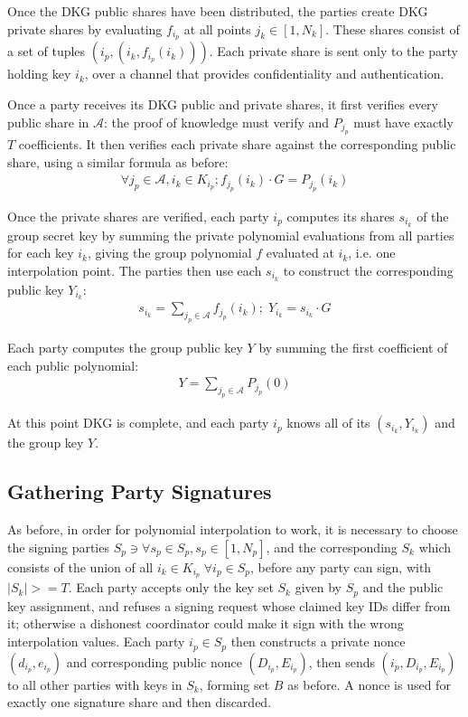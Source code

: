 \documentclass{article}
\theoremstyle{plain}
\theoremstyle{definition}
\theoremstyle{remark}
\begin{document}
Once the DKG public shares have been distributed, the parties create DKG private shares by evaluating $f_{i_p}$ at all points $j_k \in [1, N_k]$.  These shares consist of a set of tuples $(i_p, (i_k, f_{i_p}(i_k)))$.  Each private share is sent only to the party holding key $i_k$, over a channel that provides confidentiality and authentication.

Once a party receives its DKG public and private shares, it first verifies every public share in $\mathcal{A}$: the proof of knowledge must verify and $P_{j_p}$ must have exactly $T$ coefficients.  It then verifies each private share against the corresponding public share, using a similar formula as before:
\begin{align}\label{equation:wsts-dkg-check}
  \forall j_p \in \mathcal{A}, i_k \in K_{i_p}; f_{j_p}(i_k) \cdot G = P_{j_p}(i_k)
\end{align}

Once the private shares are verified, each party $i_p$ computes its shares $s_{i_k}$ of the group secret key by summing the private polynomial evaluations from all parties for each key $i_k$, giving the group polynomial $f$ evaluated at $i_k$, i.e. one interpolation point. The parties then use each $s_{i_k}$ to construct the corresponding public key $Y_{i_k}$:
\begin{align}\label{equation:wsts-share}
  s_{i_k} = \sum_{j_p \in \mathcal{A}} f_{j_p}(i_k) ;\; Y_{i_k} = s_{i_k} \cdot G
\end{align}

Each party computes the group public key $Y$ by summing the first coefficient of each public polynomial:
\begin{align}\label{equation:wsts-group-key}
  Y = \sum_{j_p \in \mathcal{A}} P_{j_p}(0)
\end{align}

At this point DKG is complete, and each party $i_p$ knows all of its $(s_{i_k}, Y_{i_k})$ and the group key $Y$.

\subsection{
  Gathering Party Signatures
}\label{section:wsts-sign}

As before, in order for polynomial interpolation to work, it is necessary to choose the signing parties $S_p \ni \forall s_p \in S_p, s_p \in [1, N_p]$, and the corresponding $S_k$ which consists of the union of all $i_k \in K_{i_p}\; \forall i_p \in S_p$, before any party can sign, with $|S_k| >= T$.  Each party accepts only the key set $S_k$ given by $S_p$ and the public key assignment, and refuses a signing request whose claimed key IDs differ from it; otherwise a dishonest coordinator could make it sign with the wrong interpolation values.  Each party $i_p \in S_p$ then constructs a private nonce $(d_{i_p},e_{i_p})$ and corresponding public nonce $(D_{i_p},E_{i_p})$, then sends $(i_p, D_{i_p},E_{i_p})$ to all other parties with keys in $S_k$, forming set $B$ as before.  A nonce is used for exactly one signature share and then discarded.
\end{document}
